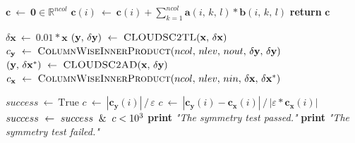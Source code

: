 \documentclass[gmd,manuscript,online]{copernicus}
\theoremstyle{theorem}
\theoremstyle{definition}
\theoremstyle{remark}
\theoremstyle{proposition}
\begin{document}
	\begin{algorithm}[t!]
		\caption{The symmetry test assessing the formal correctness of the coding implementation of the adjoint formulation of CLOUDSC2, denoted as \textsc{CLOUDSC2AD}. The machine epsilon is indicated as $\varepsilon$; all other symbols have the same meaning as in Algorithm \ref{alg:taylor-test}. Note that compared to its functional counterpart $F^* \left[ F \left( \boldsymbol{x} \right) \right] : \delta \boldsymbol{y} \mapsto \delta \boldsymbol{x}^*$, \textsc{CLOUDSC2AD($\mathbf{x}, \, \delta \mathbf{y}$)} returns both $\mathbf{y}$ and $\delta \mathbf{x}^*$.}
		\label{alg:symmetry-test}

		\begin{algorithmic}[1]
			 
			\State $\boldsymbol{c} ~ \gets ~ \mathbf{0} \in \mathbb{R}^{ncol}$
					\State $\boldsymbol{c}(i) ~ \gets ~ \boldsymbol{c}(i) + \sum_{k=1}^{ncol} \mathbf{a} \left( i, \, k, \, l \right) * \mathbf{b} \left( i, \, k, \, l \right)$
				\EndFor
			\EndFor
			\State \textbf{return} $\boldsymbol{c}$
			\EndFunction

			\Statex

			 

			\State $\delta \mathbf{x} ~ \gets ~ 0.01 * \mathbf{x}$
			\State $\left( \mathbf{y}, \, \delta \mathbf{y} \right) ~ \gets ~ \Call{CLOUDSC2TL}{\mathbf{x}, \, \delta \mathbf{x}}$ 
			\State $\boldsymbol{c}_{\mathbf{y}} ~ \gets ~ \Call{ColumnWiseInnerProduct}{ncol, \, nlev, \, nout, \, \delta \mathbf{y}, \, \delta \mathbf{y}}$
			\State $\left( \mathbf{y}, \, \delta \mathbf{x}^* \right) ~ \gets ~ \Call{CLOUDSC2AD}{\mathbf{x}, \, \delta \mathbf{y}}$ 
			\State $\boldsymbol{c}_{\mathbf{x}} ~ \gets ~ \Call{ColumnWiseInnerProduct}{ncol, \, nlev, \, nin, \, \delta \mathbf{x}, \, \delta \mathbf{x}^*}$

			\State $success ~ \gets ~ \text{True}$
					\State $c ~ \gets ~ \left| \boldsymbol{c}_{\mathbf{y}}(i) \right| \, / \, \varepsilon$
				\Else
					\State $c ~ \gets ~ \left| \boldsymbol{c}_{\mathbf{y}}(i) - \boldsymbol{c}_{\mathbf{x}}(i) \right| \, / \, \left| \varepsilon * \boldsymbol{c}_{\mathbf{x}}(i) \right|$
				\EndIf
				\State $success ~ \gets ~ success \And c < 10^3$
			\EndFor
				\State \textbf{print} \emph{"The symmetry test passed."}
			\Else
				\State \textbf{print} \emph{"The symmetry test failed."}
			\EndIf
			\EndProcedure
		\end{algorithmic}
	\end{algorithm}
\end{document}
